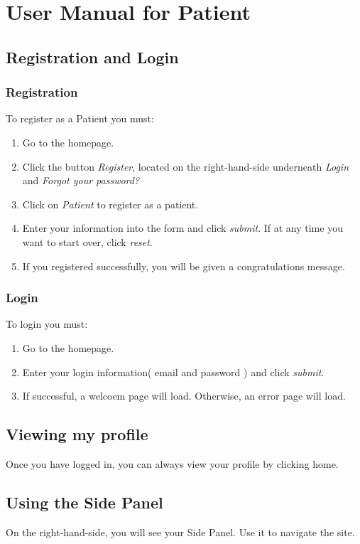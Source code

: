 \documentclass[12pt]{report}
\begin{document}
\chapter{User Manual for Patient}
\section{Registration and Login}
\subsection{Registration}
To register as a Patient you must:
\begin{enumerate}
\item Go to the homepage.
\item Click the button \textit{Register}, located on the right-hand-side underneath \textit{Login} and \textit{Forgot your password?}
\item Click on \textit{Patient} to register as a patient.
\item Enter your information into the form and click \textit{submit}. If at any time you want to start over, click \textit{reset}.
\item If you registered successfully, you will be given a congratulations message.
\end{enumerate}

\subsection{Login}
To login you must:
\begin{enumerate}
\item Go to the homepage.
\item Enter your login information( email and password ) and click \textit{submit}.
\item If successful, a welcoem page will load. Otherwise, an error page will load. 
\end{enumerate}
\section{Viewing my profile}
Once you have logged in, you can always view your profile by clicking home.

\section{Using the Side Panel}
On the right-hand-side, you will see your Side Panel. Use it to navigate the site.
\end{document}
